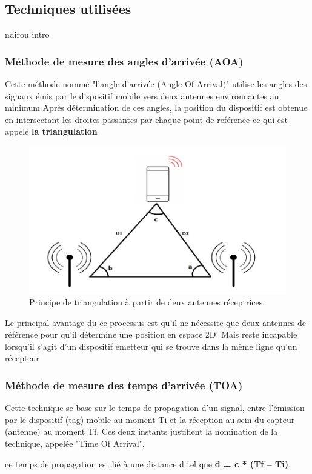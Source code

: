 \documentclass[12pt,a4paper]{report}
\begin{document}
\begin{itemize}
\subsection{Techniques utilisées}
ndirou intro
\subsubsection{Méthode de mesure des angles d’arrivée (AOA)}

Cette méthode nommé "l’angle d’arrivée (Angle Of Arrival)" utilise les angles des signaux émis par le dispositif mobile vers deux antennes environnantes au minimum
Après détermination de ces angles, la position du dispositif est obtenue en intersectant les droites passantes par chaque point de reférence ce qui est appelé \textbf{la triangulation}

\begin{figure}[H]
	\centering
	\includegraphics[width=0.5\linewidth]{Pics/triangulation.PNG}
	\caption{Principe de triangulation à partir de deux antennes réceptrices.}
	\label{fig:triangulation}
	
\end{figure}


Le principal avantage du ce processus est qu’il ne nécessite que deux antennes de référence pour qu'il détermine une position en espace 2D. Mais reste incapable lorsqu'il s'agit d'un dispositif émetteur qui se trouve dans la même ligne qu'un récepteur 


\subsubsection{Méthode de mesure des temps d’arrivée (TOA)}

Cette technique se base sur le temps de propagation d’un signal, entre l’émission par le dispositif (tag) mobile au moment Ti et la réception au sein du capteur (antenne) au moment Tf. Ces deux instants justifient la nomination de la technique, appelée  "Time Of Arrival".

ce temps de propagation est lié à une distance d tel que \textbf{d = c * (Tf – Ti)},


\end{itemize}
\end{document}
